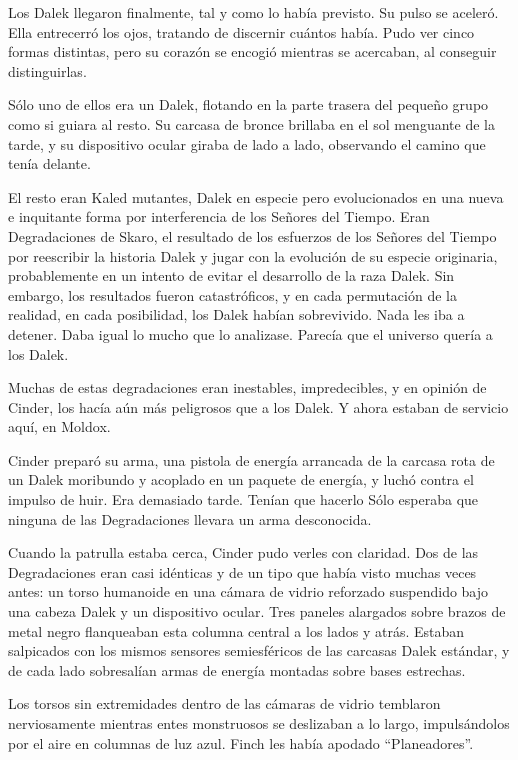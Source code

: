 Los Dalek llegaron finalmente, tal y como lo había previsto. Su pulso se aceleró. Ella entrecerró los ojos, tratando de discernir cuántos había. Pudo ver cinco formas distintas, pero su corazón se encogió mientras se acercaban, al conseguir distinguirlas.

Sólo uno de ellos era un Dalek, flotando en la parte trasera del pequeño grupo como si guiara al resto. Su carcasa de bronce brillaba en el sol menguante de la tarde, y su dispositivo ocular giraba de lado a lado, observando el camino que tenía delante.

El resto eran Kaled mutantes, Dalek en especie pero evolucionados en una nueva e inquitante forma por interferencia de los Señores del Tiempo. Eran Degradaciones de Skaro, el resultado de los esfuerzos de los Señores del Tiempo por reescribir la historia Dalek y jugar con la evolución de su especie originaria, probablemente en un intento de evitar el desarrollo de la raza Dalek. Sin embargo, los resultados fueron catastróficos, y en cada permutación de la realidad, en cada posibilidad, los Dalek habían sobrevivido. Nada les iba a detener. Daba igual lo mucho que lo analizase. Parecía que el universo quería a los Dalek.

Muchas de estas degradaciones eran inestables, impredecibles, y en opinión de Cinder, los hacía aún más peligrosos que a los Dalek. Y ahora estaban de servicio aquí, en Moldox.

Cinder preparó su arma, una pistola de energía arrancada de la carcasa rota de un Dalek moribundo y acoplado en un paquete de energía, y luchó contra el impulso de huir. Era demasiado tarde. Tenían que hacerlo Sólo esperaba que ninguna de las Degradaciones llevara un arma desconocida.

Cuando la patrulla estaba cerca, Cinder pudo verles con claridad. Dos de las Degradaciones eran casi idénticas y de un tipo que había visto muchas veces antes: un torso humanoide en una cámara de vidrio reforzado suspendido bajo una cabeza Dalek y un dispositivo ocular. Tres paneles alargados sobre brazos de metal negro flanqueaban esta columna central a los lados y atrás. Estaban salpicados con los mismos sensores semiesféricos de las carcasas Dalek estándar, y de cada lado sobresalían armas de energía montadas sobre bases estrechas.

Los torsos sin extremidades dentro de las cámaras de vidrio temblaron nerviosamente mientras entes monstruosos se deslizaban a lo largo, impulsándolos por el aire en columnas de luz azul. Finch les había apodado “Planeadores”.

